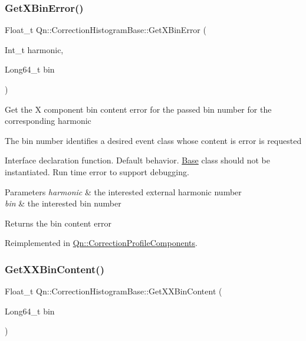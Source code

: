 \subsubsection{\texorpdfstring{Get\+X\+Bin\+Error()}{GetXBinError()}}
{\footnotesize\ttfamily Float\+\_\+t Qn\+::\+Correction\+Histogram\+Base\+::\+Get\+X\+Bin\+Error (\begin{DoxyParamCaption}\item[{Int\+\_\+t}]{harmonic,  }\item[{Long64\+\_\+t}]{bin }\end{DoxyParamCaption})\hspace{0.3cm}{\ttfamily [virtual]}}

Get the X component bin content error for the passed bin number for the corresponding harmonic

The bin number identifies a desired event class whose content is error is requested

Interface declaration function. Default behavior. \mbox{\hyperlink{classBase}{Base}} class should not be instantiated. Run time error to support debugging.


\begin{DoxyParams}{Parameters}
{\em harmonic} & the interested external harmonic number \\
\hline
{\em bin} & the interested bin number \\
\hline
\end{DoxyParams}
\begin{DoxyReturn}{Returns}
the bin content error 
\end{DoxyReturn}


Reimplemented in \mbox{\hyperlink{classQn_1_1CorrectionProfileComponents_ae531786bf5f3e39e7b0eb8b02ed2405f}{Qn\+::\+Correction\+Profile\+Components}}.

\mbox{\label{classQn_1_1CorrectionHistogramBase_a5ed53d98b57fa9e9ec4de78ae518d9d9}} 
\subsubsection{\texorpdfstring{Get\+X\+X\+Bin\+Content()}{GetXXBinContent()}\hspace{0.1cm}{\footnotesize\ttfamily [1/2]}}
{\footnotesize\ttfamily Float\+\_\+t Qn\+::\+Correction\+Histogram\+Base\+::\+Get\+X\+X\+Bin\+Content (\begin{DoxyParamCaption}\item[{Long64\+\_\+t}]{bin }\end{DoxyParamCaption})\hspace{0.3cm}{\ttfamily [virtual]}}

